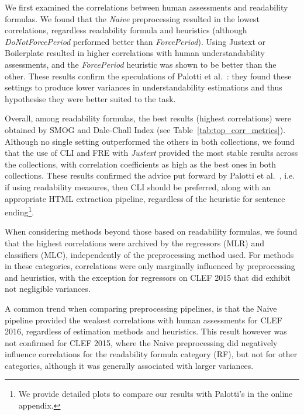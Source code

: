 We first examined the correlations between human assessments and readability formulas. We found that the \textit{Naive} preprocessing resulted in the lowest correlations, regardless readability formula and heuristics (although \textit{DoNotForcePeriod} performed better than \textit{ForcePeriod}). Using Justext or Boilerplate resulted in higher correlations with human understandability assessments, and the \textit{ForcePeriod} heuristic was shown to be better than the other. These results confirm the speculations of Palotti et al.~\cite{palotti15}: they found these settings to produce lower variances in understandability estimations and thus hypothesise they were better suited to the task.

Overall, among readability formulas, the best results (highest correlations) were obtained by SMOG and Dale-Chall Index (see Table~\ref{tab:top_corr_metrics}). Although no single setting outperformed the others in both collections, we found that the use of CLI and FRE with \textit{Justext} provided the most stable results across the collections, with correlation coefficients as high as the best ones in both collections.
These results confirmed the advice put forward by Palotti et al.~\cite{palotti15}, i.e. if using readability measures, then CLI should be preferred, along with an appropriate HTML extraction pipeline, regardless of the heuristic for sentence ending\footnote{We provide detailed plots to compare our results with Palotti's in the online appendix.}.

When considering methods beyond those based on readability formulas, we found that the highest correlations were archived by the regressors (MLR) and classifiers (MLC), independently of the preprocessing method used. For methods in these categories, correlations were only marginally influenced by preprocessing and heuristics, with the exception for regressors on CLEF 2015 that did exhibit not negligible variances.  

A common trend when comparing preprocessing pipelines, is that the Naive pipeline provided the weakest correlations with human assessments for CLEF 2016, regardless of estimation methods and heuristics. This result however was not confirmed for CLEF 2015, where the Naive preprocessing did negatively influence correlations for the readability formula category (RF), but not for other categories, although it was generally associated with larger variances. 


